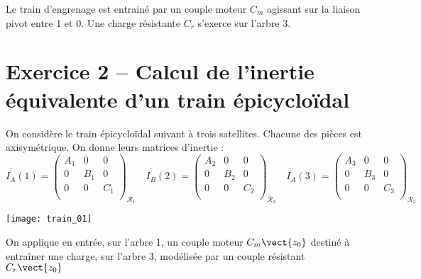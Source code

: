 Le train d'engrenage est entrainé par un couple moteur $C_m$ agissant sur la liaison pivot entre 1 et 0. Une charge résistante $C_r$ s'exerce sur l'arbre 3. 




\section*{Exercice 2 -- Calcul de l'inertie équivalente d'un train épicycloïdal}

On considère le train épicycloïdal suivant à trois satellites. Chacune des pièces est axisymétrique. On donne leurs matrices d'inertie :
$$
\overline{\overline{I_A}}(1) = 
\begin{pmatrix} 
A_1 & 0 & 0 \\
0 & B_1 & 0 \\
0 & 0 & C_1 \\
\end{pmatrix}_{\mathcal{R}_1}
\quad
\overline{\overline{I_B}}(2) = 
\begin{pmatrix} 
A_2 & 0 & 0 \\
0 & B_2 & 0 \\
0 & 0 & C_2 \\
\end{pmatrix}_{\mathcal{R}_2}
\quad
\overline{\overline{I_A}}(3) = 
\begin{pmatrix} 
A_3 & 0 & 0 \\
0 & B_3 & 0 \\
0 & 0 & C_3 \\
\end{pmatrix}_{\mathcal{R}_3}
$$


\begin{marginfigure}
\texttt{[image: train\_01]}
\end{marginfigure}


On applique en entrée, sur l'arbre 1, un couple moteur $C_m\vect{z_0}$ destiné à entraîner une charge, sur l'arbre 3, modélisée par un couple résistant  $C_r\vect{z_0}$

